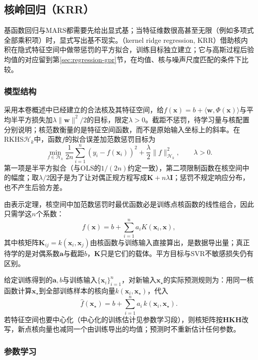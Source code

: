 \subsection{核岭回归（KRR）}
\label{sec:regression-krr}

基函数回归与MARS都需要先给出显式基；当特征维数很高甚至无限（例如多项式全部乘积项）时，显式写出基不现实。（kernel ridge regression, KRR）借助核内积在隐式特征空间中做带惩罚的平方拟合，训练目标独立建立；它与高斯过程后验均值的对应留到第\ref{sec:regression-gpr}节，在均值、核与噪声尺度匹配的条件下比较。

\subsubsection{模型结构}
\label{sec:regression-krr-structure}

采用本卷概述中已经建立的合法核及其特征空间，给$f(\bm{x})=b+\langle\bm{w},\Phi(\bm{x})\rangle$与平均半平方损失加$\lambda\lVert\bm{w}\rVert^2/2$的目标，限定$\lambda>0$。截距不惩罚，待学习量与核配置分别说明；核范数衡量的是特征空间函数，而不是原始输入坐标上的斜率。在RKHS$\mathcal H_k$中，函数$f$的拟合误差加范数惩罚目标为
\begin{equation}
  \min_{f\in\mathcal H_k}
  \frac{1}{2n}\sum_{i=1}^n(y_i-f(\bm{x}_i))^2
  +\frac{\lambda}{2}\lVert f\rVert_{\mathcal H_k}^2,
  \qquad\lambda>0.
  \label{eq:regression-krr-objective}
\end{equation}
第一项是半平方拟合（与OLS的$1/(2n)$约定一致），第二项限制函数在核空间中的幅度；取$\lambda/2$因子是为了让对偶正规方程写成$\bm{K}+n\lambda\bm{I}$；惩罚不规定响应分布，也不产生后验方差。

由表示定理，核空间中加范数惩罚时最优函数必是训练点核函数的线性组合，因此只需学这$n$个系数：
\[
  f(\bm{x})=b+\sum_{i=1}^n a_iK(\bm{x}_i,\bm{x}),
\]
其中核矩阵$\bm{K}_{ij}=k(\bm{x}_i,\bm{x}_j)$由核函数与训练输入直接算出，是数据导出量；真正待学的是对偶系数$\bm{a}$与截距$b$，$\bm{K}$只是它们的载体。平方目标与SVR不敏感损失仍有区别。

给定训练得到的$\bm{a},b$与训练输入$\{\bm{x}_i\}_{i=1}^n$，对新输入$\bm{x}_\star$的实际预测规则为：用同一核函数计算$\bm{x}_\star$到全部训练样本的核向量$k(\bm{x}_i,\bm{x}_\star)$，代入
\[
  \widehat f(\bm{x}_\star)=b+\sum_{i=1}^n a_i\,k(\bm{x}_i,\bm{x}_\star).
\]
若特征空间也要中心化（中心化的训练估计见参数学习段），则核矩阵按$\bm{H}\bm{K}\bm{H}$改写，新点核向量也减同一个由训练导出的均值；预测时不重新估计任何参数。

\subsubsection{参数学习}
\label{sec:regression-krr-learning}

